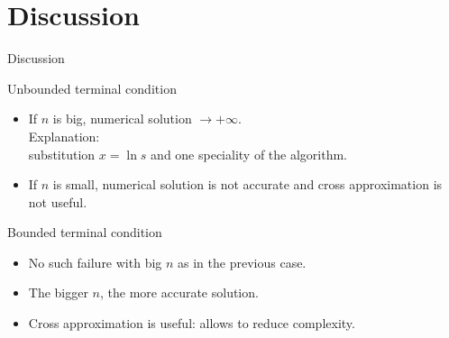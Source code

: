 \documentclass{beamer}
\theoremstyle{definition}
\theoremstyle{plain}
\theoremstyle{remark}
\begin{document}
	\section{Discussion}

		\begin{frame}{Discussion}
			\vspace{-7pt}
			\begin{block}{Unbounded terminal condition}
				\begin{itemize}
					\item If $n$ is big, numerical solution $\rightarrow +\infty$.\\
					Explanation: \\substitution $x = \ln s$ and one speciality of the algorithm.
					\item If $n$ is small, numerical solution is not accurate and cross approximation is not useful.
				\end{itemize}
			\end{block}
			\vspace{-3pt}
			\begin{block}{Bounded terminal condition}
				\begin{itemize}
					\item No such failure with big $n$ as in the previous case.
					\item The bigger $n$, the more accurate solution.
					\item Cross approximation is useful: allows to reduce complexity.
				\end{itemize}
			\end{block}
		\end{frame}
	
	\section*{}

		\begin{frame}{}
		\end{frame}
\end{document}
